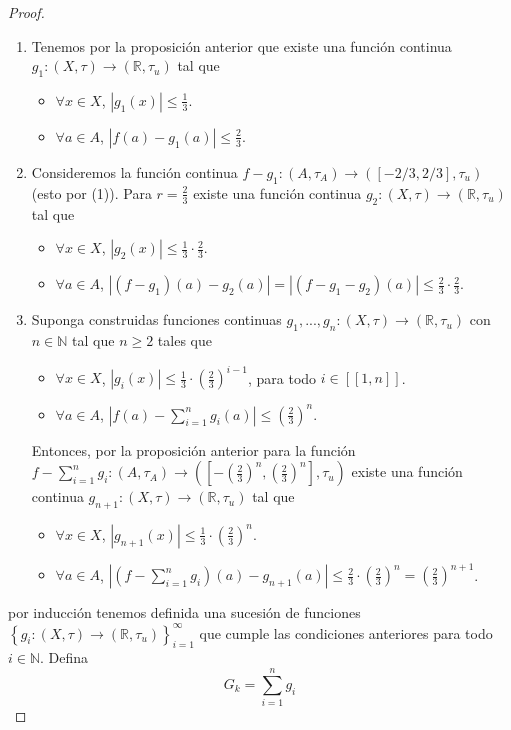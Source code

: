 \documentclass[12pt]{report}
\theoremstyle{largebreak}
\newcommand\abs[1]{\ensuremath{\left|#1\right|}}
\newcommand\cf[3]{\ensuremath{#1:#2\rightarrow#3}}
\newcommand\natint[1]{\ensuremath{\left[\!\left[ #1\right]\!\right]}}
\begin{document}
\begin{proof}
        \begin{enumerate}
            \item Tenemos por la proposición anterior que existe una función continua $\cf{g_1}{(X,\tau)}{(\mathbb{R},\tau_u)}$ tal que
            \begin{itemize}
                \item $\forall x\in X$, $\abs{g_1(x)}\leq\frac{1}{3}$.
                \item $\forall a\in A$, $\abs{f(a)-g_1(a)}\leq\frac{2}{3}$.
            \end{itemize}
            \item Consideremos la función continua $\cf{f-g_1}{(A,\tau_A)}{([-2/3,2/3],\tau_u)}$ (esto por (1)). Para $r=\frac{2}{3}$ existe una función continua $\cf{g_2}{(X,\tau)}{(\mathbb{R},\tau_u)}$ tal que
            \begin{itemize}
                \item $\forall x\in X$, $\abs{g_2(x)}\leq\frac{1}{3}\cdot\frac{2}{3}$.
                \item $\forall a\in A$, $\abs{(f-g_1)(a)-g_2(a)}=\abs{(f-g_1-g_2)(a)}\leq\frac{2}{3}\cdot\frac{2}{3}$.
            \end{itemize}
            \item Suponga construidas funciones continuas $\cf{g_1,...,g_n}{(X,\tau)}{(\mathbb{R},\tau_u)}$ con $n\in\mathbb{N}$ tal que $n\geq 2$ tales que
            \begin{itemize}
                \item $\forall x\in X$, $\abs{g_i(x)}\leq\frac{1}{3}\cdot\left(\frac{2}{3}\right)^{i-1}$, para todo $i\in\natint{1,n}$.
                \item $\forall a\in A$, $\abs{f(a)-\sum_{ i=1}^n g_i(a)}\leq\left(\frac{2}{3}\right)^n$.
            \end{itemize}
            Entonces, por la proposición anterior para la función $\cf{f-\sum_{ i=1}^n g_i}{(A,\tau_A)}{\left(\left[-\left(\frac{2}{3}\right)^n,\left(\frac{2}{3}\right)^n\right],\tau_u\right) }$ existe una función continua $\cf{g_{ n+1}}{(X,\tau)}{(\mathbb{R},\tau_u)}$ tal que
            \begin{itemize}
                \item $\forall x\in X$, $\abs{g_{ n+1}(x)}\leq\frac{1}{3}\cdot\left(\frac{2}{3}\right)^n$.
                \item $\forall a\in A$, $\abs{(f-\sum_{ i=1}^n g_i)(a)-g_{ n+1}(a)}\leq\frac{2}{3}\cdot\left(\frac{2}{3}\right)^n=\left(\frac{2}{3}\right)^{n+1}$.
            \end{itemize}
        \end{enumerate}
        por inducción tenemos definida una sucesión de funciones $\left\{\cf{g_i}{(X,\tau)}{(\mathbb{R},\tau_u)} \right\}_{ i=1}^\infty$ que cumple las condiciones anteriores para todo $i\in\mathbb{N}$. Defina
        \begin{equation*}
            G_k=\sum_{ i=1}^n g_i
        \end{equation*}


\end{proof}
\end{document}
